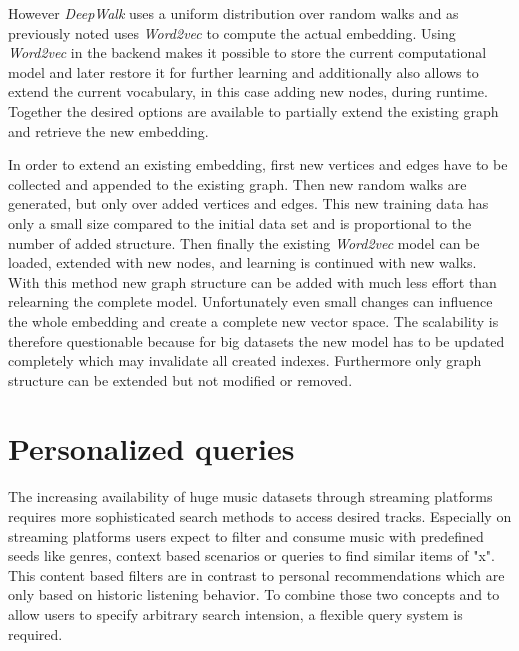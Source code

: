 \documentclass[a4paper]{llncs}
\begin{document}
	However \emph{DeepWalk} uses a uniform distribution over random walks and as previously noted uses \emph{Word2vec} to compute the actual embedding. Using  \emph{Word2vec} in the backend makes it possible to store the current computational model and later restore it for further learning and additionally also allows to extend the current vocabulary, in this case adding new nodes, during runtime. Together the desired options are available to partially extend the existing graph and retrieve the new embedding.
	
	In order to extend an existing embedding, first new vertices and edges have to be collected and appended to the existing graph. Then new random walks are generated, but only over added vertices and edges. This new training data has only a small size compared to the initial data set and is proportional to the number of added structure. Then finally the existing \emph{Word2vec} model can be loaded, extended with new nodes, and learning is continued with new walks. \\
	
	
	With this method new graph structure can be added with much less effort than relearning the complete model. Unfortunately even small changes can influence the whole embedding and create a complete new vector space. The scalability is therefore questionable because for big datasets the new model has to be updated completely which may invalidate all created indexes. Furthermore only graph structure can be extended but not modified or removed.
	
	
	\section{Personalized queries}
	The increasing availability of huge music datasets through streaming platforms requires more sophisticated search methods to access desired tracks. Especially on streaming platforms users expect to filter and consume music with predefined seeds like genres, context based scenarios or queries to find similar items of "x". This content based filters are in contrast to personal recommendations which are only based on historic listening behavior. To combine those two concepts and to allow users to specify arbitrary search intension, a flexible query system is required.
	
\end{document}
